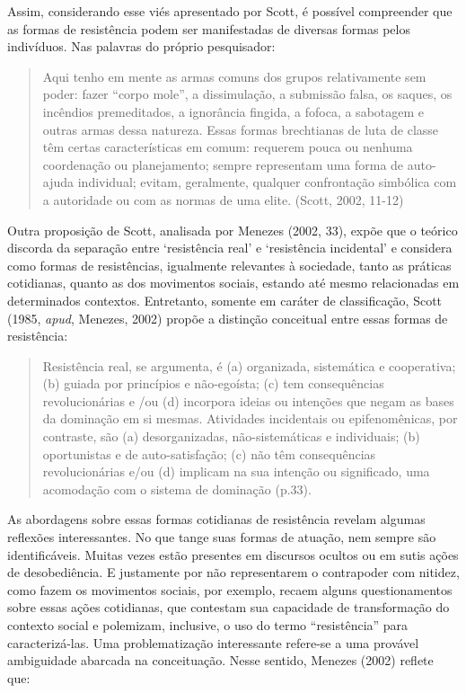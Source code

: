 Assim, considerando esse viés apresentado por Scott, é possível
compreender que as formas de resistência podem ser manifestadas de
diversas formas pelos indivíduos. Nas palavras do próprio pesquisador:

\begin{quote}
Aqui tenho em mente as armas comuns dos grupos relativamente sem poder:
fazer ``corpo mole'', a dissimulação, a submissão falsa, os saques, os
incêndios premeditados, a ignorância fingida, a fofoca, a sabotagem e
outras armas dessa natureza. Essas formas brechtianas de luta de classe
têm certas características em comum: requerem pouca ou nenhuma
coordenação ou planejamento; sempre representam uma forma de auto-ajuda
individual; evitam, geralmente, qualquer confrontação simbólica com a
autoridade ou com as normas de uma elite. (Scott, 2002, 11-12)
\end{quote}

Outra proposição de Scott, analisada por Menezes (2002, 33), expõe que o
teórico discorda da separação entre `resistência real' e `resistência
incidental' e considera como formas de resistências, igualmente
relevantes à sociedade, tanto as práticas cotidianas, quanto as dos
movimentos sociais, estando até mesmo relacionadas em determinados
contextos. Entretanto, somente em caráter de classificação, Scott (1985,
\emph{apud}, Menezes, 2002) propõe a distinção conceitual entre essas
formas de resistência:

\begin{quote}
Resistência real, se argumenta, é (a) organizada, sistemática e
cooperativa; (b) guiada por princípios e não-egoísta; (c) tem
consequências revolucionárias e /ou (d) incorpora ideias ou intenções
que negam as bases da dominação em si mesmas. Atividades incidentais ou
epifenomênicas, por contraste, são (a) desorganizadas, não-sistemáticas
e individuais; (b) oportunistas e de auto-satisfação; (c) não têm
consequências revolucionárias e/ou (d) implicam na sua intenção ou
significado, uma acomodação com o sistema de dominação (p.33).
\end{quote}

As abordagens sobre essas formas cotidianas de resistência revelam
algumas reflexões interessantes. No que tange suas formas de atuação,
nem sempre são identificáveis. Muitas vezes estão presentes em discursos
ocultos ou em sutis ações de desobediência. E justamente por não
representarem o contrapoder com nitidez, como fazem os movimentos
sociais, por exemplo, recaem alguns questionamentos sobre essas ações
cotidianas, que contestam sua capacidade de transformação do contexto
social e polemizam, inclusive, o uso do termo ``resistência'' para
caracterizá-las. Uma problematização interessante refere-se a uma
provável ambiguidade abarcada na conceituação. Nesse sentido, Menezes
(2002) reflete que:

